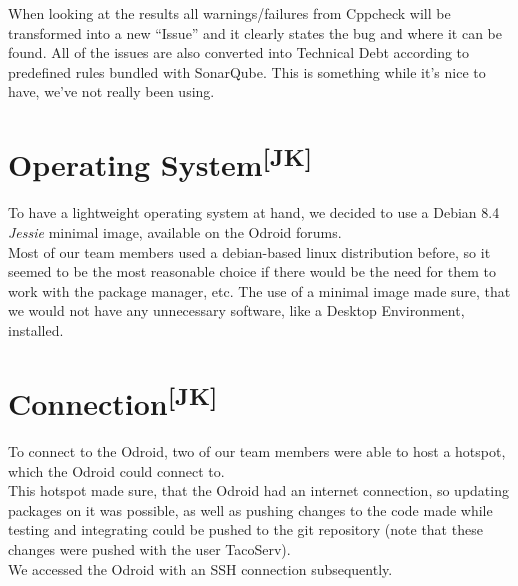 \noindent
When looking at the results all warnings/failures from Cppcheck will be
transformed into a new ``Issue'' and it clearly states the bug and where it can
be found. All of the issues are also converted into Technical Debt according to
predefined rules bundled with SonarQube. This is something while it's nice to
have, we've not really been using.

\section[Operating System]{Operating System\textsuperscript{[JK]}}
To have a lightweight operating system at hand, we decided to use a Debian 8.4
\textit{Jessie} minimal image, available on the Odroid forums.\\
Most of our team members used a debian-based linux distribution before, so it
seemed to be the most reasonable choice if there would be the need for them to
work with the package manager, etc. The use of a minimal image made sure, that
we would not have any unnecessary software, like a Desktop Environment,
installed.

\section[Connection]{Connection\textsuperscript{[JK]}}
To connect to the Odroid, two of our team members were able to host a hotspot,
which the Odroid could connect to.\\
This hotspot made sure, that the Odroid had an internet connection, so updating
packages on it was possible, as well as pushing changes to the code made while
testing and integrating could be pushed to the git repository (note that these
changes were pushed with the user TacoServ).\\
We accessed the Odroid with an SSH connection subsequently.